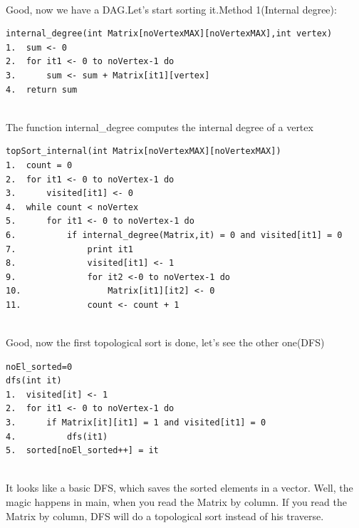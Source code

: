 \documentclass[14pt]{article}
\begin{document}
\\ Good, now we have a DAG.Let's start sorting it.Method 1(Internal degree):
\begin{lstlisting}
internal_degree(int Matrix[noVertexMAX][noVertexMAX],int vertex)
1.  sum <- 0
2.  for it1 <- 0 to noVertex-1 do
3.      sum <- sum + Matrix[it1][vertex]
4.  return sum
\end{lstlisting}
\\The function internal\_degree computes the internal degree of a vertex
\begin{lstlisting}
topSort_internal(int Matrix[noVertexMAX][noVertexMAX])
1.  count = 0
2.  for it1 <- 0 to noVertex-1 do
3.      visited[it1] <- 0
4.  while count < noVertex
5.      for it1 <- 0 to noVertex-1 do
6.          if internal_degree(Matrix,it) = 0 and visited[it1] = 0
7.              print it1
8.              visited[it1] <- 1
9.              for it2 <-0 to noVertex-1 do
10.                 Matrix[it1][it2] <- 0
11.             count <- count + 1
\end{lstlisting}
\\Good, now the first topological sort is done, let's see the other one(DFS)
\begin{lstlisting}
noEl_sorted=0
dfs(int it)
1.  visited[it] <- 1
2.  for it1 <- 0 to noVertex-1 do
3.      if Matrix[it][it1] = 1 and visited[it1] = 0
4.          dfs(it1)
5.  sorted[noEl_sorted++] = it
\end{lstlisting}
\\It looks like a basic DFS, which saves the sorted elements in a vector. Well, the magic happens in main, when you read the Matrix by column. If you read the Matrix by column, DFS will do a topological sort instead of his traverse.



\newpage
\end{document}
